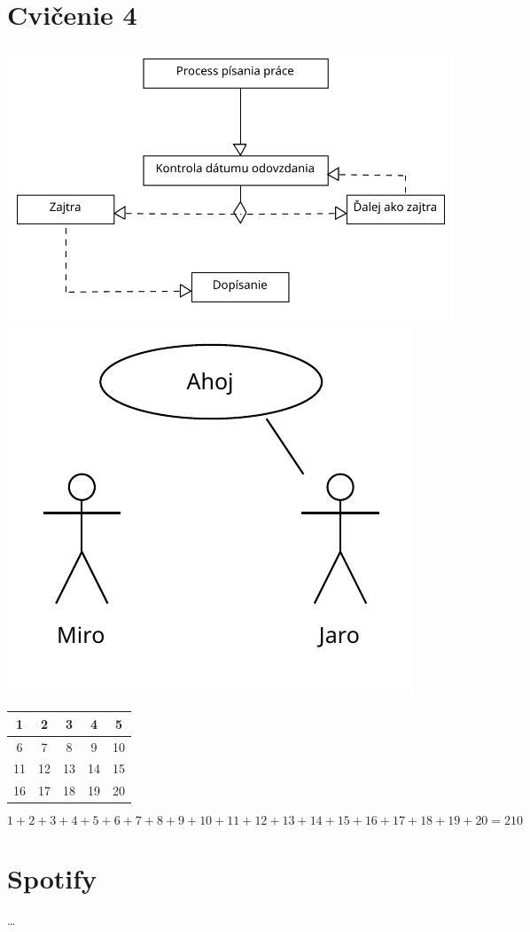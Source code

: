 \documentclass[10pt,twocolumn,twoside,slovak,a4paper]{article}
\begin{document}
\section{Cvičenie 4}
\includegraphics[width=0.5\linewidth]{graphics/diagram1.pdf}
\hfil
\includegraphics[width=0.5\linewidth,angle=45]{graphics/kamosi.pdf}

\begin{tabular}{|c|c|c|c|c|}
\hline
	1&2&3&4&5\\
\hline
	6&7&8&9&10\\
\hline
	11&12&13&14&15\\
\hline
	16&17&18&19&20 \\
\hline
\end{tabular}

\begin{equation}
	1+2+3+4+5+6+7+8+9+10+11+12+13+14+15+16+17+18+19+20=210
\end{equation}
\section{Spotify}\label{spotify}
\dots
\end{document}
